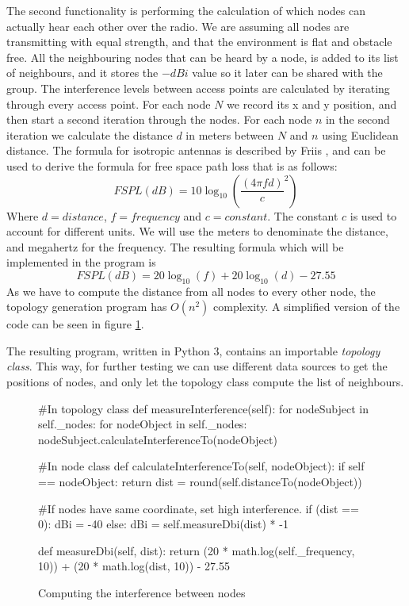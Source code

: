 	The second functionality is performing the calculation of which nodes can actually hear each other over the radio.
	We are assuming all nodes	are transmitting with equal strength, and that the environment is flat and obstacle free. 
	All the neighbouring nodes that can be heard by a node, is added to its list of neighbours, and it stores the $-dBi$ value so it later can be shared with
	the group. The interference levels between access points are calculated by iterating through every access point. For each node $N$ we record its x and y position,
	and then start a second iteration through the nodes. For each node $n$ in the second iteration we calculate the distance $d$ in
	meters between $N$ and $n$ using Euclidean distance. The formula for isotropic antennas is described by Friis \cite{Friis46}, and can be used to
	derive the formula for free space path loss \cite{FSPL} that is as follows:
\[
	FSPL(dB) = 10\log_{10} \left( \frac{ (4 \pi f d)}{c} ^2 \right) 
\]	
	Where $d = distance$, $f = frequency$ and $c=constant$. The constant $c$ is used to account for different units. We will use the meters to denominate the distance,
	and megahertz for the frequency. The resulting formula which will be implemented in the program is
\[
	FSPL(dB) = 20\log_{10}\left( f \right)  + 20\log_{10} \left(d\right) - 27.55
\]	
	As we have to compute the distance from all nodes to every other node, the topology generation program has $O(n^2)$ complexity. A simplified version of the code
	can be seen in figure \ref{fig:dbiCreation}. 

	The resulting program, written in Python 3\cite{Python3}, contains an importable \textit{topology class}. This way, for further testing we can use different data
	sources to get the positions of nodes, and only let the topology class compute the list of neighbours. 
	

	\begin{figure}[H]
		\begin{python}
#In topology class
def measureInterference(self):
 for nodeSubject in self._nodes:  
  for nodeObject in self._nodes:
    nodeSubject.calculateInterferenceTo(nodeObject) 

#In node class
def calculateInterferenceTo(self, nodeObject):
 if self == nodeObject:
  return
 dist = round(self.distanceTo(nodeObject))

#If  nodes have same coordinate, set high interference. 
 if (dist == 0):
  dBi = -40
 else:
  dBi  = self.measureDbi(dist) * -1

def measureDbi(self, dist):
 return (20 * math.log(self._frequency, 10)) + 
(20 * math.log(dist, 10)) - 27.55

			\end{python}
			\caption{Computing the interference between nodes}
			\label{fig:dbiCreation}
			\end{figure}

